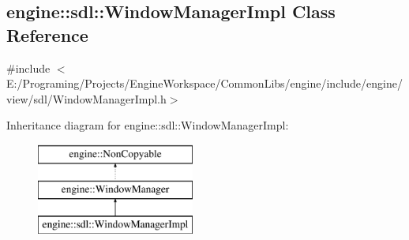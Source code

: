 \hypertarget{a00089}{}\subsection{engine\+:\+:sdl\+:\+:Window\+Manager\+Impl Class Reference}
\label{a00089}


{\ttfamily \#include $<$E\+:/\+Programing/\+Projects/\+Engine\+Workspace/\+Common\+Libs/engine/include/engine/view/sdl/\+Window\+Manager\+Impl.\+h$>$}

Inheritance diagram for engine\+:\+:sdl\+:\+:Window\+Manager\+Impl\+:\begin{figure}[H]
\begin{center}
\leavevmode
\includegraphics[height=3.000000cm]{a00089}
\end{center}
\end{figure}

